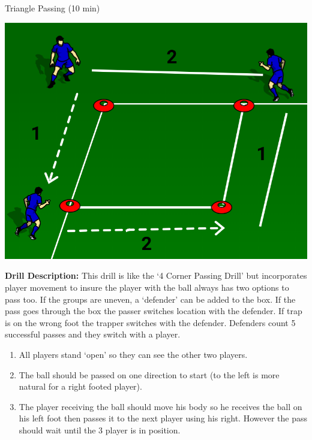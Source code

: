 \begin{evenBlock}{Triangle Passing (10 min)}

\begin{minipage}[t]{\linewidth}
    \centering
    
    \begin{minipage}{.3\linewidth} %
        \includegraphics[width=\textwidth]{../img/Trimmed/Triangle_Passing_3P_mini}
    \end{minipage}
    \hspace{0.05\linewidth}
    \begin{minipage}{.6\linewidth} %
        \textbf{Drill Description:}
        This drill is like the `4 Corner Passing Drill' but incorporates player movement to insure the player with the ball always has two options to pass too.
        If the groups are uneven, a `defender' can be added to the box.  If the pass goes through the box the passer switches location with the defender.  If trap is on the wrong foot the trapper switches with the defender.  Defenders count 5 successful passes and they switch with a player.
        \begin{enumerate}
            \setlength{\itemsep}{0pt}
            \setlength{\parskip}{0pt}
            \setlength{\parsep}{0pt}
            \item All players stand `open' so they can see the other two players.
            \item The ball should be passed on one direction to start (to the left is more natural for a right footed player).
            \item The player receiving the ball should move his body so he receives the ball on his left foot then passes it to the next player using his right.  However the pass should wait until the 3 player is in position.

\end{enumerate}
\end{minipage}
\end{minipage}
\end{evenBlock}
